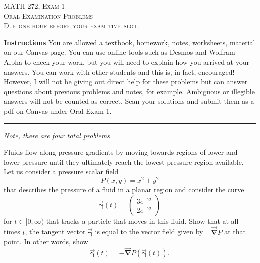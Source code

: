\documentclass[12pt]{amsbook}
\newcommand{\curvegamma}{\boldsymbol{\vec{\gamma}}}
\newcommand{\tangentgamma}{\boldsymbol{\dot{\vec{\gamma}}}}
\newcommand{\grad}{\boldsymbol{\vec{\nabla}}}
\begin{document}

\begin{center}
   \textsc{\large MATH 272, Exam 1}\\
   \textsc{Oral Examination Problems}\\
   \textsc{Due one hour before your exam time slot.}
\end{center}

\vspace{1cm}

\noindent\textbf{Instructions} \; You are allowed a textbook, homework, notes, worksheets, material on our Canvas page.  You can use online tools such as Desmos and Wolfram Alpha to check your work, but you will need to explain how you arrived at your answers.  You can work with other students and this is, in fact, encouraged! However, I will not be giving out direct help for these problems but can answer questions about previous problems and notes, for example. Ambiguous or illegible answers will not be counted as correct. Scan your solutions and submit them as a pdf on Canvas under Oral Exam 1.


\vspace{1cm}


\hrule

\vspace*{1cm}
\noindent\emph{Note, there are four total problems.}

\newpage

\begin{problem} Fluids flow along pressure gradients by moving towards regions of lower and lower pressure until they ultimately reach the lowest pressure region available. Let us consider a pressure scalar field
\[
P(x,y) = x^2+y^2
\] 
that describes the pressure of a fluid in a planar region and consider the curve
\[
\curvegamma(t) = \begin{pmatrix} 3e^{-2t} \\ 2e^{-2t} \end{pmatrix}
\]
for $t\in [0,\infty)$ that tracks a particle that moves in this fluid. Show that at all times $t$, the tangent vector $\tangentgamma$ is equal to the vector field given by $-\grad P$ at that point. In other words, show
\[
\tangentgamma(t) = -\grad P(\curvegamma(t)).
\]
\end{problem}
\end{document}
